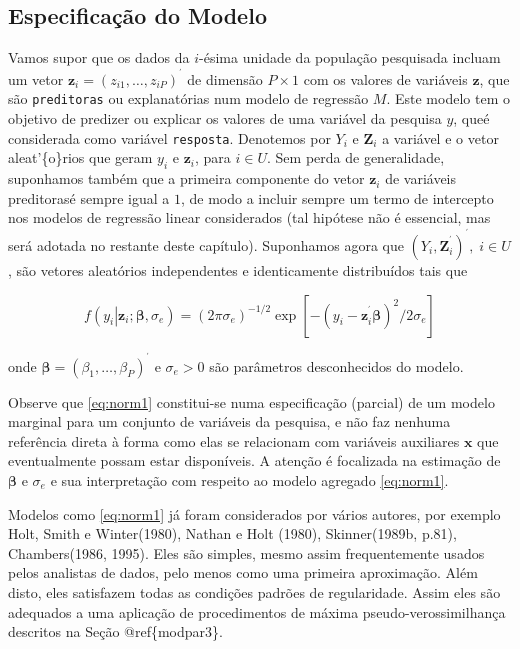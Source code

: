 \documentclass[]{book}
\begin{document}
\subsection{Especificação do Modelo}\label{especificacao-do-modelo}

Vamos supor que os dados da \(i\)-ésima unidade da população pesquisada
incluam um vetor
\(\mathbf{z}_{i}=\left( z_{i1},\ldots ,z_{iP}\right) ^{^{\prime }}\) de
dimensão \(P\times 1\) com os valores de variáveis \(\mathbf{z}\), que
são \texttt{preditoras} ou explanatórias num modelo de regressão \(M\).
Este modelo tem o objetivo de predizer ou explicar os valores de uma
variável da pesquisa \(y\), queé considerada como variável
\texttt{resposta}. Denotemos por \(Y_{i}\) e \(\mathbf{Z}_{i}\) a
variável e o vetor aleat'\{o\}rios que geram \(y_{i}\) e
\(\mathbf{z}_{i}\), para \(i\in U\). Sem perda de generalidade,
suponhamos também que a primeira componente do vetor \(\mathbf{z}_{i}\)
de variáveis preditorasé sempre igual a \(1\), de modo a incluir sempre
um termo de intercepto nos modelos de regressão linear considerados (tal
hipótese não é essencial, mas será adotada no restante deste capítulo).
Suponhamos agora que
\(\left( Y_{i},\mathbf{Z}_{i}^{^{\prime }}\right) ^{^{\prime }},\;i\in U\),
são vetores aleatórios independentes e identicamente distribuídos tais
que

\begin{equation}
f\left( \left. y_{i}\right|\mathbf{z}_{i};\mathbf{\beta },\sigma_{e}\right) =\left( 2\pi \sigma _{e}\right) ^{-1/2}\exp \left[ -\left( y_{i}-\mathbf{z}_{i}^{^{\prime }}\mathbf{\beta }\right) ^{2}/2\sigma _{e}\right]
\label{eq:norm1}
\end{equation}

onde
\(\mathbf{\beta }=\left( \beta _{1},\ldots ,\beta _{P}\right) ^{^{\prime }}\)
e \(\sigma_{e}>0\) são parâmetros desconhecidos do modelo.

Observe que \eqref{eq:norm1} constitui-se numa especificação (parcial) de
um modelo marginal para um conjunto de variáveis da pesquisa, e não faz
nenhuma referência direta à forma como elas se relacionam com variáveis
auxiliares \(\mathbf{x}\) que eventualmente possam estar disponíveis. A
atenção é focalizada na estimação de \(\mathbf{\beta }\) e
\(\sigma_{e}\) e sua interpretação com respeito ao modelo agregado
\eqref{eq:norm1}.

Modelos como \eqref{eq:norm1} já foram considerados por vários autores,
por exemplo Holt, Smith e Winter(1980), Nathan e Holt (1980),
Skinner(1989b, p.81), Chambers(1986, 1995). Eles são simples, mesmo
assim frequentemente usados pelos analistas de dados, pelo menos como
uma primeira aproximação. Além disto, eles satisfazem todas as condições
padrões de regularidade. Assim eles são adequados a uma aplicação de
procedimentos de máxima pseudo-verossimilhança descritos na Seção
@ref\{modpar3\}.
\end{document}
